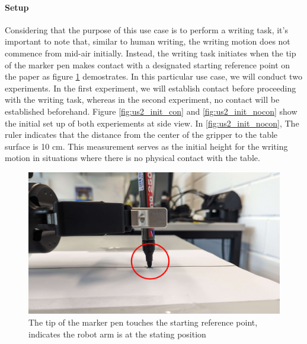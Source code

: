 \documentclass[report.tex]{subfiles}
\begin{document}
    \paragraph{\large{Setup}\\}
    Considering that the purpose of this use case is to perform a writing task, it's important to note that, similar to human writing, the writing motion does not commence from mid-air initially. Instead, the writing task initiates when the tip of the marker pen makes contact with a designated starting reference point on the paper as figure \ref{fig:us2_pen} demostrates. In this particular use case, we will conduct two experiments. In the first experiment, we will establish contact before proceeding with the writing task, whereas in the second experiment, no contact will be established beforehand. Figure \ref{fig:us2_init_con} and \ref{fig:us2_init_nocon} show the initial set up of both experiements at side view. In \ref{fig:us2_init_nocon}, The ruler indicates that the distance from the center of the gripper to the table surface is 10 cm. This measurement serves as the initial height for the writing motion in situations where there is no physical contact with the table.
    \begin{figure}[H]
        \centering
        \captionsetup[figure]{justification=centering}
        \includegraphics[width=0.8\linewidth]{images/us2_starting_circle.jpg}
        \caption{The tip of the marker pen touches the starting reference point, indicates the robot arm is at the stating position}
        \label{fig:us2_pen}
    \end{figure}
\end{document}
